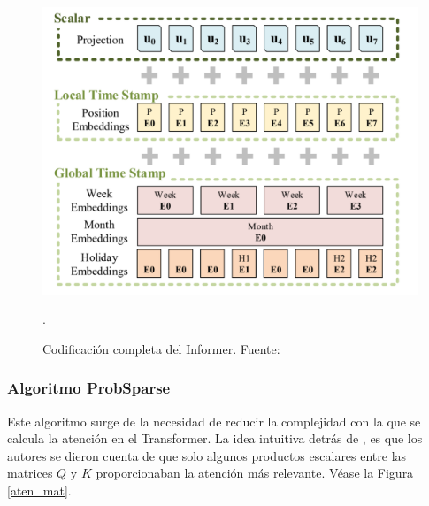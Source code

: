 \begin{figure}[H]
    \centering
    \includegraphics[scale = 0.35]{imgs/cod_inf.png}
    \caption{Codificación completa del Informer. \scriptsize{Fuente: \parencite{informer}}}.
    \label{cod_inf}
\end{figure}

\subsubsection{Algoritmo ProbSparse}
\label{ap:prob}

Este algoritmo surge de la necesidad de reducir la complejidad con la que se calcula la atención en el Transformer. La idea intuitiva detrás de , es que los autores se dieron cuenta de que solo algunos productos escalares entre las matrices $Q$ y $K$ proporcionaban la atención más relevante. Véase la Figura \ref{aten_mat}.

